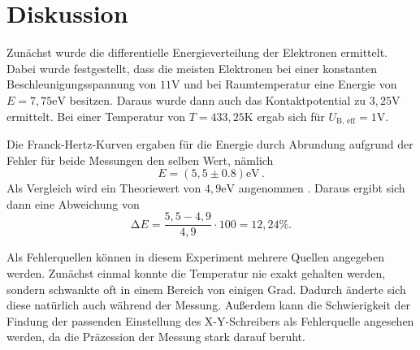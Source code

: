 \section{Diskussion}
\label{sec:Diskussion}

Zunächst wurde die differentielle Energieverteilung der Elektronen ermittelt.
Dabei wurde festgestellt, dass die meisten Elektronen bei einer konstanten Beschleunigungsspannung von $11 \unit\V$ und bei Raumtemperatur eine Energie von $E = 7,75 \unit\eV$ besitzen.
Daraus wurde dann auch das Kontaktpotential zu $3,25 \unit\V$ ermittelt.
Bei einer Temperatur von $T = 433,25 \unit\K$ ergab sich für $U_\text{B, eff} = 1 \unit\V$.

Die Franck-Hertz-Kurven ergaben für die Energie durch Abrundung aufgrund der Fehler für beide Messungen den selben Wert,
nämlich
\begin{equation}
    E = (5,5 \pm 0.8)\unit\eV \, .
\end{equation}
Als Vergleich wird ein Theoriewert von $4,9 \unit\eV$ angenommen \cite{Franck_Hertz}.
Daraus ergibt sich dann eine Abweichung von 
\begin{equation}
    \increment E = \frac{5,5 - 4,9}{4,9} \cdot 100 = 12,24 \%.
\end{equation}

Als Fehlerquellen können in diesem Experiment mehrere Quellen angegeben werden.
Zunächst einmal konnte die Temperatur nie exakt gehalten werden, sondern schwankte oft in einem Bereich von einigen Grad.
Dadurch änderte sich diese natürlich auch während der Messung.
Außerdem kann die Schwierigkeit der Findung der passenden Einstellung des X-Y-Schreibers als Fehlerquelle angesehen werden, da die Präzession der Messung stark darauf beruht.